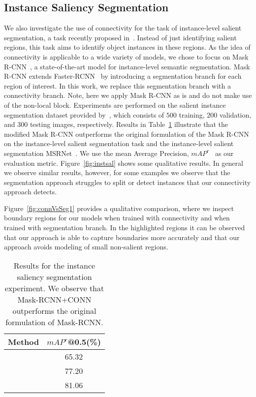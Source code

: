 \documentclass[journal]{IEEEtran}
\begin{document}
\subsection{Instance Saliency Segmentation}
We also investigate the use of connectivity for the task of instance-level salient segmentation, a task recently proposed in~\cite{li2017instance}. Instead of just identifying salient regions, this task aims to identify object instances in these regions. As the idea of connectivity is applicable to a wide variety of models, we chose to focus on Mask R-CNN~\cite{he2017mask}, a state-of-the-art model for instance-level semantic segmentation. Mask R-CNN extends Faster-RCNN~\cite{ren2017faster} by introducing a segmentation branch for each region of interest. In this work, we replace this segmentation branch with a connectivity branch. Note, here we apply Mask R-CNN as is and do not make use of the non-local block. Experiments are performed on the salient instance segmentation dataset provided by~\cite{li2017instance}, which consists of $500$ training, $200$ validation, and $300$ testing images, respectively. Results in Table~\ref{tab:results_inst} illustrate that the modified Mask R-CNN outperforms the original formulation of the Mask R-CNN on the instance-level salient segmentation task and the instance-level salient segmentation MSRNet~\cite{li2017instance}. We use the mean Average Precision, $mAP^r$~\cite{hariharan2014simultaneous} as our evaluation metric. Figure~\ref{fig:instsal} shows some qualitative results. In general we observe similar results, however, for some examples we observe that the segmentation approach struggles to split or detect instances that our connectivity approach detects. 

Figure~\ref{fig:connVsSeg1} provides a qualitative comparison, where we inspect boundary regions for our models when trained with connectivity and when trained with segmentation branch. In the highlighted regions it can be observed that our approach is able to capture boundaries more accurately and that our approach avoids modeling of small non-salient regions.

\bgroup
\def\arraystretch{1} 
\begin{table}[tbp] \small
\centering
\caption{Results for the instance saliency segmentation experiment. We observe that Mask-RCNN+CONN outperforms the original formulation of Mask-RCNN.}
\label{tab:results_inst}
\begin{tabular}{l|c}
\toprule{\bf Method} & {$mAP^r$@0.5(\%)}\\
\midrule{\multirow{1}{*}{\bf MSRNet}} & 65.32\\
{\multirow{1}{*}{\bf Mask-RCNN}} & 77.20\\
{\multirow{1}{*}{\bf Mask-RCNN+CONN}} & 81.06\\
\bottomrule
\end{tabular}
\end{table}
\egroup 
\end{document}
